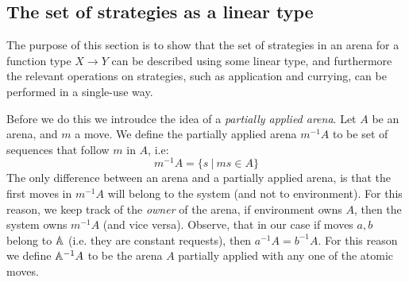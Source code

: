 \subsection{The set of strategies as a linear type}
The purpose of this section is to show that the set of strategies in an arena for a function type $X \to Y$ can be described using some linear type, and furthermore the relevant operations on strategies, such as application and currying, can be performed in a single-use way.

Before we do this we introudce the idea of a \emph{partially applied arena}.
Let $A$ be an arena, and $m$ a move. We define the partially applied arena ${m^{-1}}A$ 
to be set of sequences that follow $m$ in $A$, i.e:
\[m^{-1}A = \{s \ | \ ms \in A \}\]
The only difference between an arena and a partially applied arena, is that the first moves in $m^{-1}A$ will belong to the system (and not to environment).
For this reason, we keep track of the \emph{owner} of the arena, if environment owns $A$, then the system owns $m^{-1}A$ (and vice versa).
Observe, that in our case if moves $a, b$ belong to $\mathbb A$ (i.e. they are constant requests), then $a^{-1}A = b^{-1}A$. 
For this reason we define $\mathbb A^{-1}A$ to be the arena $A$ partially applied with any one of the atomic moves. 

